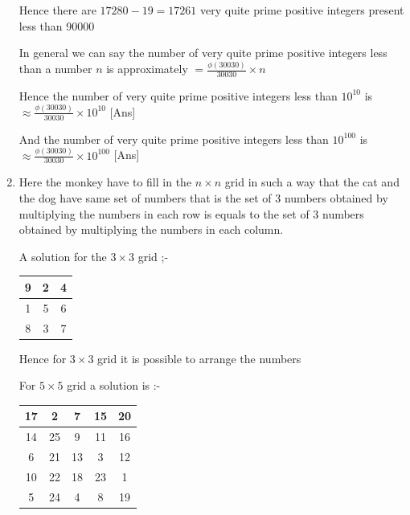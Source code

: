\documentclass{article}
\begin{document}
\begin{enumerate}
Hence  there are $17280-19=17261$ very quite prime positive integers present less than 90000
\bigskip

\bigskip

In general we can say the number of very quite prime positive integers less than a number $n$ is approximately $=\displaystyle{\frac{\phi (30030)}{30030}\times n}$ 
\bigskip

\bigskip


Hence  the number of very quite prime positive integers less than $10^{10}$ is $\approx \displaystyle{\frac{\phi (30030)}{30030}\times 10^{10}} $ [Ans]

\bigskip

\bigskip


And the number of very quite prime positive integers less than $10^{100}$ is  $\approx \displaystyle{\frac{\phi (30030)}{30030}\times 10^{100}} $ [Ans]


\pagebreak

\item Here the monkey have to fill in the $n\times n$ grid in such a way that the cat and the dog have same set of numbers that is the set of 3 numbers obtained by multiplying the numbers in each row is equals to the set of 3 numbers obtained by multiplying the numbers in each column.

A solution for the $3\times 3$ grid ;-
\begin{center}
  \begin{tabular}{| c | c | c |}
     \hline
     9 & 2 & 4 \\
     \hline
     1 & 5 & 6 \\
     \hline
     8 & 3 & 7 \\
     \hline
  \end{tabular}
\end{center}

Hence for $3\times 3$ grid it is possible to arrange the numbers

For $5\times 5$ grid a solution is :-

\begin{center}
  \begin{tabular}{| c | c | c | c | c |}
     \hline
     17 & 2 & 7 & 15 & 20 \\
     \hline
     14 & 25 & 9 & 11 & 16 \\
     \hline
     6 & 21 & 13 & 3 & 12 \\
     \hline
    10 & 22 & 18 & 23 & 1 \\
     \hline
     5 & 24 & 4 & 8 & 19  \\
     \hline
  \end{tabular}
\end{center}


\end{enumerate}
\end{document}
